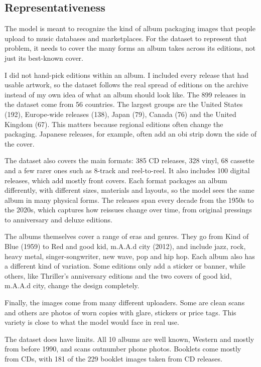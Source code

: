 \documentclass[11pt,a4paper]{article}
\begin{document}
\subsection{Representativeness}
The model is meant to recognize the kind of album packaging images that people upload to music databases and marketplaces. For the dataset to represent that problem, it needs to cover the many forms an album takes across its editions, not just its best-known cover.

I did not hand-pick editions within an album. I included every release that had usable artwork, so the dataset follows the real spread of editions on the archive instead of my own idea of what an album should look like. The 899 releases in the dataset come from 56 countries. The largest groups are the United States (192), Europe-wide releases (138), Japan (79), Canada (76) and the United Kingdom (67). This matters because regional editions often change the packaging. Japanese releases, for example, often add an obi strip down the side of the cover.

The dataset also covers the main formats: 385 CD releases, 328 vinyl, 68 cassette and a few rarer ones such as 8-track and reel-to-reel. It also includes 100 digital releases, which add mostly front covers. Each format packages an album differently, with different sizes, materials and layouts, so the model sees the same album in many physical forms. The releases span every decade from the 1950s to the 2020s, which captures how reissues change over time, from original pressings to anniversary and deluxe editions.

The albums themselves cover a range of eras and genres. They go from Kind of Blue (1959) to Red and good kid, m.A.A.d city (2012), and include jazz, rock, heavy metal, singer-songwriter, new wave, pop and hip hop. Each album also has a different kind of variation. Some editions only add a sticker or banner, while others, like Thriller's anniversary editions and the two covers of good kid, m.A.A.d city, change the design completely.

Finally, the images come from many different uploaders. Some are clean scans and others are photos of worn copies with glare, stickers or price tags. This variety is close to what the model would face in real use.

The dataset does have limits. All 10 albums are well known, Western and mostly from before 1990, and scans outnumber phone photos. Booklets come mostly from CDs, with 181 of the 229 booklet images taken from CD releases.
\end{document}
